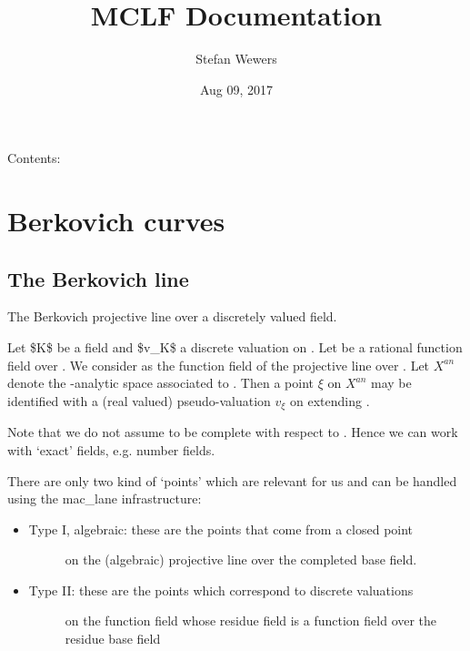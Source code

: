\documentclass[letterpaper,10pt,english]{sphinxmanual}
\title{MCLF Documentation}
\date{Aug 09, 2017}
\author{Stefan Wewers}
\begin{document}
\maketitle
\tableofcontents
{}\label{index::doc}


Contents:


\chapter{Berkovich curves}
\label{berkovich:berkovich-curves}\label{berkovich::doc}\label{berkovich:welcome-to-mclf-s-documentation}

\section{The Berkovich line}
\label{berkovich_line::doc}\label{berkovich_line:the-berkovich-line}\label{berkovich_line:module-mclf.berkovich.berkovich_line}
The Berkovich projective line over a discretely valued field.

Let \$K\$ be a field and \$v\_K\$ a discrete valuation on . Let 
be a rational function field over . We consider  as the function
field of the projective line  over . Let \(X^{an}\) denote the
-analytic space associated to . Then a point \(\xi\) on
\(X^{an}\) may be identified with a (real valued) pseudo-valuation
\(v_\xi\) on  extending .

Note that we do not assume  to be complete with respect to . Hence we
can work with `exact' fields, e.g. number fields.

There are only two kind of `points' which are relevant for us and can be handled
using the mac\_lane infrastructure:
\begin{itemize}
\item {} \begin{description}
\item[{Type I, algebraic: these are the points that come from a closed point}] \leavevmode
on the (algebraic) projective line over the completed base field.

\end{description}

\item {} \begin{description}
\item[{Type II: these are the points which correspond to discrete valuations}] \leavevmode
on the function field whose residue field is a function field over the
residue base field

\end{description}

\end{itemize}
\end{document}
